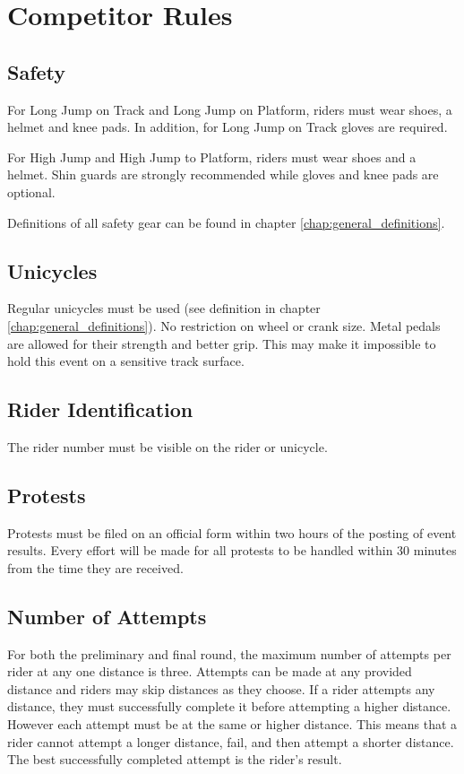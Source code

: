 \chapter{Competitor Rules}

\section{Safety}

For Long Jump on Track and Long Jump on Platform, riders must wear shoes, a helmet and knee pads.
In addition, for Long Jump on Track gloves are required.

For High Jump and High Jump to Platform, riders must wear shoes and a helmet.
Shin guards are strongly recommended while gloves and knee pads are optional.

Definitions of all safety gear can be found in chapter \ref{chap:general_definitions}.

\section{Unicycles}

Regular unicycles must be used (see definition in chapter \ref{chap:general_definitions}).
No restriction on wheel or crank size.
Metal pedals are allowed for their strength and better grip.
This may make it impossible to hold this event on a sensitive track surface.

\section{Rider Identification}

The rider number must be visible on the rider or unicycle.

\section{Protests}

Protests must be filed on an official form within two hours of the posting of event results.
Every effort will be made for all protests to be handled within 30 minutes from the time they are received.

\section{Number of Attempts}
For both the preliminary and final round, the maximum number of attempts per rider at any one distance is three.
Attempts can be made at any provided distance and riders may skip distances as they choose.
If a rider attempts any distance, they must successfully complete it before attempting a higher distance.
However each attempt must be at the same or higher distance.
This means that a rider cannot attempt a longer distance, fail, and then attempt a shorter distance.
The best successfully completed attempt is the rider's result.

